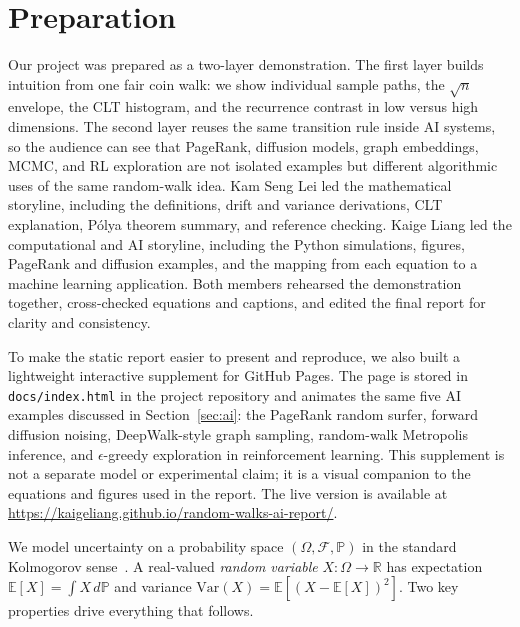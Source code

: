 \documentclass[conference,a4paper,10pt]{IEEEtran}
\begin{document}
\section{Preparation}\label{sec:prep}
Our project was prepared as a two-layer demonstration. The first layer
builds intuition from one fair coin walk: we show individual sample paths,
the $\sqrt{n}$ envelope, the CLT histogram, and the recurrence contrast in
low versus high dimensions. The second layer reuses the same transition
rule inside AI systems, so the audience can see that PageRank, diffusion
models, graph embeddings, MCMC, and RL exploration are not isolated
examples but different algorithmic uses of the same random-walk idea.
Kam Seng Lei led the mathematical storyline, including the definitions,
drift and variance derivations, CLT explanation, P\'{o}lya theorem
summary, and reference checking. Kaige Liang led the computational and AI
storyline, including the Python simulations, figures, PageRank and
diffusion examples, and the mapping from each equation to a machine
learning application. Both members rehearsed the demonstration together,
cross-checked equations and captions, and edited the final report for
clarity and consistency.

To make the static report easier to present and reproduce, we also built
a lightweight interactive supplement for GitHub Pages. The page is stored
in \texttt{docs/index.html} in the project repository and animates the
same five AI examples discussed in Section~\ref{sec:ai}: the PageRank
random surfer, forward diffusion noising, DeepWalk-style graph sampling,
random-walk Metropolis inference, and $\epsilon$-greedy exploration in
reinforcement learning. This supplement is not a separate model or
experimental claim; it is a visual companion to the equations and figures
used in the report. The live version is available at
\url{https://kaigeliang.github.io/random-walks-ai-report/}.

We model uncertainty on a probability space $(\Omega,\mathcal{F},\mathbb{P})$
in the standard Kolmogorov sense~\cite{durrett2019probability}. A
real-valued \emph{random variable} $X:\Omega\to\mathbb{R}$ has expectation
$\mathbb{E}[X]=\int X\,d\mathbb{P}$ and variance
$\mathrm{Var}(X)=\mathbb{E}[(X-\mathbb{E}[X])^{2}]$. Two key properties drive
everything that follows.
\end{document}
